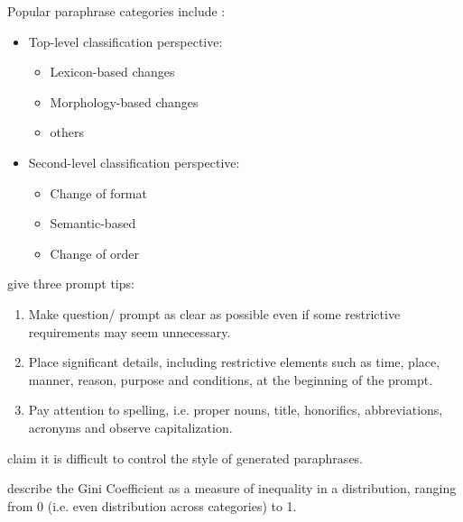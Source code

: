 Popular paraphrase categories include \cite{fu_learning_2024}:
\begin{itemize}
    \item Top-level classification perspective: 
        \begin{itemize}
            \item Lexicon-based changes
            \item Morphology-based changes
            \item others
        \end{itemize}
    \item Second-level classification perspective:
        \begin{itemize}
            \item Change of format
            \item Semantic-based
            \item Change of order
        \end{itemize}
\end{itemize}

\citet{fu_learning_2024} give three prompt tips:
\begin{enumerate}
    \item Make question/ prompt as clear as possible even if some restrictive requirements may seem unnecessary.
    \item Place significant details, including restrictive elements such as time, place, manner, reason, purpose and conditions, at the beginning of the prompt.
    \item Pay attention to spelling, i.e. proper nouns, title, honorifics, abbreviations, acronyms and observe capitalization.
\end{enumerate}

\citet{zhou_paraphrase_2021} claim it is difficult to control the style of generated paraphrases.


\citet{fu_learning_2024} describe the Gini Coefficient as a measure of inequality in a distribution, ranging from 0 (i.e. even distribution across categories) to 1.
